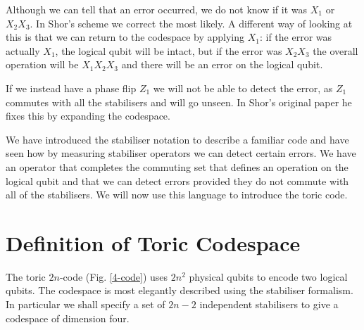 Although we can tell that an error occurred, we do not know if it was $X_1$ or $X_2X_3$. In Shor's scheme we correct the most likely. A different way of looking at this is that we can return to the codespace by applying $X_1$: if the error was actually $X_1$, the logical qubit will be intact, but if the error was $X_2X_3$ the overall operation will be $X_1X_2X_3$ and there will be an error on the logical qubit.

If we instead have a phase flip $Z_1$ we will not be able to detect the error, as $Z_1$ commutes with all the stabilisers and will go unseen. In Shor's original paper he fixes this by expanding the codespace.

We have introduced the stabiliser notation to describe a familiar code and have seen how by measuring stabiliser operators we can detect certain errors. We have an operator that completes the commuting set that defines an operation on the logical qubit and that we can detect errors provided they do not commute with all of the stabilisers. We will now use this language to introduce the toric code.

\section{Definition of Toric Codespace}

The toric $2n$-code (Fig. \ref{4-code}) uses $2n^2$ physical qubits to encode two logical qubits. The codespace is most elegantly described using the stabiliser formalism. In particular we shall specify a set of $2n - 2$ independent stabilisers to give a codespace of dimension four.

